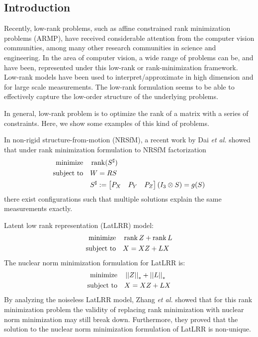 \documentclass[11pt]{article}
\begin{document}
\subsection{Introduction}

Recently, low-rank problems, such as affine constrained rank minimization problems (ARMP), have received considerable attention from the computer vision communities, among many other research communities in science and engineering. In the area of computer vision, a wide range of problems can be, and have been, represented under this low-rank or rank-minimization framework. Low-rank models have been used to interpret/approximate in high dimension and for large scale measurements. The low-rank formulation seems to be able to effectively capture the low-order structure of the underlying problems.

In general, low-rank problem is to optimize the rank of a matrix with a series of constraints. Here, we show some examples of this kind of problems.

\begin{example}
    In non-rigid structure-from-motion (NRSfM), a recent work by Dai \emph{et al.} showed that under rank minimization formulation to NRSfM factorization
    \[\begin{aligned}
        \textnormal{minimize}\quad & \operatorname{rank}(S^{\sharp})\\
        \textnormal{subject to}\quad & W=RS\\
        & S^{\sharp}:=\begin{bmatrix}P_X & P_Y & P_Z\end{bmatrix}\left(I_3\otimes S\right)=g(S)
    \end{aligned}\]
    there exist configurations such that multiple solutions explain the same measurements exactly.
\end{example}

\begin{example}\label{eg:latlrr}
    Latent low rank representation (LatLRR) model:
    \[\begin{aligned}
        \textnormal{minimize}\quad & \operatorname{rank} Z+\operatorname{rank} L\\
        \textnormal{subject to}\quad & X=XZ+LX
    \end{aligned}\]
    The nuclear norm minimization formulation for LatLRR is:
    \[\begin{aligned}
        \textnormal{minimize}\quad & \left|\left|Z\right|\right|_\ast+\left|\left|L\right|\right|_\ast\\
        \textnormal{subject to}\quad & X=XZ+LX
    \end{aligned}\]
    By analyzing the noiseless LatLRR model, Zhang \emph{et al.} showed that for this rank minimization problem the validity of replacing rank minimization with nuclear norm minimization may still break down. Furthermore, they proved that the solution to the nuclear norm minimization formulation of LatLRR is non-unique.\cite{dai2014rank}
\end{example}
\end{document}
